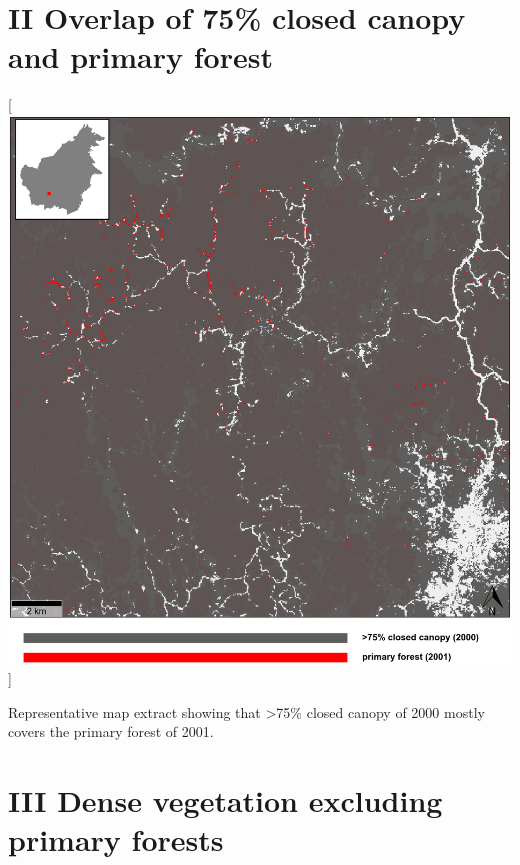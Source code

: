 \documentclass[
  letterpaper,
  DIV=11,
  numbers=noendperiod]{scrreprt}
\begin{document}
\newpage

\hypertarget{overlap-of-75-closed-canopy-and-primary-forest}{%
\section*{\texorpdfstring{\textsc{II} Overlap of 75\% closed canopy and
primary
forest}{ Overlap of 75\% closed canopy and primary forest}}\label{overlap-of-75-closed-canopy-and-primary-forest}}


\color{white}

{[}\includegraphics[width=1\textwidth,height=\textheight]{text/../code/results/maps/fcover2000_75_and_primary_forest.png}{]}
\normalcolor

Representative map extract showing that \textgreater75\% closed canopy
of 2000 mostly covers the primary forest of 2001. \newpage

\hypertarget{dense-vegetation-excluding-primary-forests}{%
\section*{\texorpdfstring{\textsc{III} Dense vegetation excluding
primary
forests}{ Dense vegetation excluding primary forests}}\label{dense-vegetation-excluding-primary-forests}}
\end{document}
